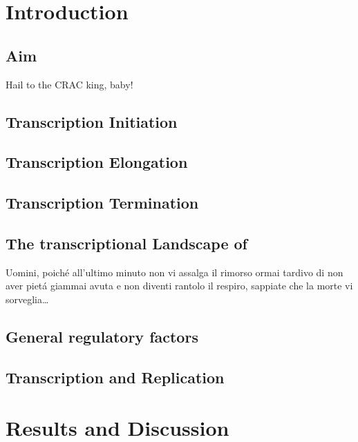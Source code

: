 \documentclass{Thesis}
\begin{document}
\listoftodos
\frontmatter

\part{Introduction}
\chapter{Aim}
	
\begin{savequote}[70mm]
Hail to the CRAC king, baby!
\end{savequote}

\chapter{Transcription Initiation}
	
\chapter{Transcription Elongation}
	
\chapter{Transcription Termination} \label{termination}
	
\chapter{The transcriptional Landscape of \cer{}}
	
	
\begin{savequote}[70mm]
Uomini, poich\'{e} all'ultimo minuto non vi assalga il rimorso ormai tardivo di non aver piet\'{a} giammai avuta e non diventi rantolo il respiro, sappiate che la morte vi sorveglia\ldots
{} 
\end{savequote}
\chapter{General regulatory factors}
	

\chapter{Transcription and Replication}
	


\part{Results and Discussion}
	
%	
%	




\singlespacing


\end{document}
